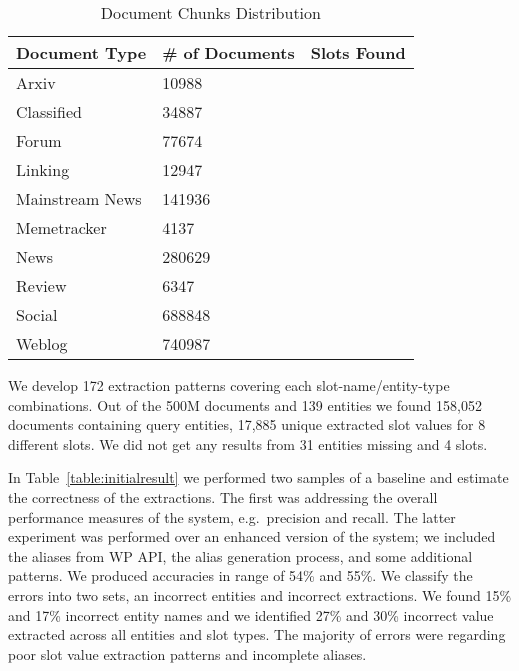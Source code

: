 \begin{table}
\caption{Document Chunks Distribution }
\centering
\label{table:documentsDist}

\begin{tabular}{|l|l|c|}
\hline 
\textbf{Document Type} & \textbf{\# of Documents} &  \textbf{Slots Found}\\ 
\hline 
Arxiv & 10988 & \\ \hline
 Classified & 34887 & \\ \hline
 Forum & 77674 & \\ \hline
 Linking & 12947 & \\ \hline
 Mainstream News & 141936 & \\ \hline
 Memetracker & 4137 & \\ \hline
 News & 280629 & \\ \hline
 Review & 6347 & \\ \hline
 Social & 688848 & \\ \hline
 Weblog & 740987 & \\ \hline
\hline 
\end{tabular} 
\end{table}


 
 
 
We develop 172 extraction patterns covering each slot-name/entity-type combinations.
Out of the 500M documents and 139 entities we found 158,052 documents containing query entities, 17,885 unique extracted slot values for 8 different slots.
We did not get any results from 31 entities missing and 4 slots.

In Table~\ref{table:initialresult} we performed two samples of a baseline and estimate the correctness of the extractions.
The first was addressing the overall performance measures of the system, e.g.\ precision and recall.
The latter experiment was performed over an enhanced version of the system; we included the aliases from WP API, the alias generation process, and some additional patterns. 
We produced accuracies in range of  54\% and 55\%.
We classify the errors into two sets, an incorrect entities and incorrect extractions.
We found 15\% and 17\% incorrect entity names and we identified 27\% and 30\% incorrect value extracted across all entities and slot types.
The majority of errors were regarding poor slot value extraction patterns and incomplete aliases.

